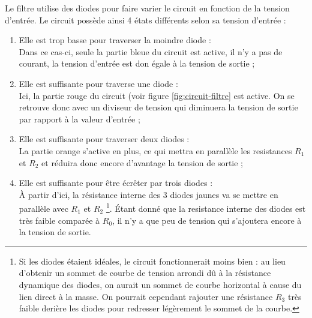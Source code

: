 Le filtre utilise des diodes pour faire varier le circuit en fonction de la tension d'entrée. 
Le circuit possède ainsi 4 états différents selon sa tension d'entrée :
\begin{enumerate}
	\item Elle est trop basse pour traverser la moindre diode :\\
				Dans ce cas-ci, seule la partie bleue du circuit est active, 
				il n'y a pas de courant, la tension d'entrée est don égale à
				la tension de sortie ;
	\item Elle est suffisante pour traverse une diode :\\
				Ici, la partie rouge du circuit (voir figure \ref{fig:circuit-filtre} est active. 
				On se retrouve donc avec un diviseur de tension qui diminuera la tension de sortie par rapport à la valeur d'entrée ;
	\item Elle est suffisante pour traverser deux diodes :\\
				La partie orange s'active en plus, ce qui mettra en parallèle les resistances $R_1$ et $R_2$ et
				réduira donc encore d'avantage la tension de sortie ;
	\item Elle est suffisante pour être écrêter par trois diodes :\\
				À partir d'ici, la résistance interne des 3 diodes jaunes va se mettre en parallèle avec $R_1$ et $R_2$
				\footnote{Si les diodes étaient idéales,
				le circuit fonctionnerait moins bien : au lieu d'obtenir un sommet de courbe de tension 
				arrondi dû à la résistance dynamique des diodes, on aurait un sommet de courbe
				horizontal à cause du lien direct à la masse. On pourrait cependant rajouter une résistance
				$R_3$ très faible derière les diodes pour redresser légèrement le sommet de la courbe.}. Étant donné que la 
				resistance interne des diodes est très faible comparée à $R_0$, il n'y a que peu de tension
				qui s'ajoutera encore à la tension de sortie.
\end{enumerate}

